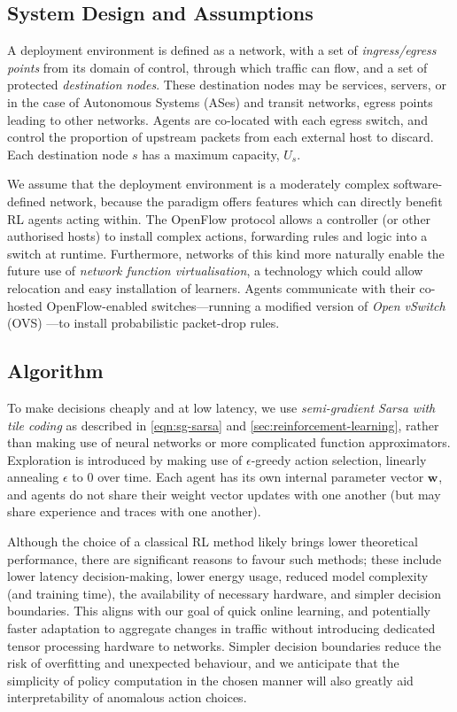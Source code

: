 \documentclass[10pt, times, conference, letterpaper]{IEEEtran}
\newcommand{\wvec}[1]{\ensuremath{\bm{w}_{#1}}}
\begin{document}
\subsection{System Design and Assumptions}
A deployment environment is defined as a network, with a set of \emph{ingress/egress points} from its domain of control, through which traffic can flow, and a set of protected \emph{destination nodes}.
These destination nodes may be services, servers, or in the case of Autonomous Systems (ASes) and transit networks, egress points leading to other networks.
Agents are co-located with each egress switch, and control the proportion of upstream packets from each external host to discard.
Each destination node $s$ has a maximum capacity, $U_s$.

We assume that the deployment environment is a moderately complex software-defined network, because the paradigm offers features which can directly benefit RL agents acting within.
The OpenFlow protocol allows a controller (or other authorised hosts) to install complex actions, forwarding rules and logic into a switch at runtime.
Furthermore, networks of this kind more naturally enable the future use of \emph{network function virtualisation}, a technology which could allow relocation and easy installation of learners.
Agents communicate with their co-hosted OpenFlow-enabled switches---running a modified version of \emph{Open vSwitch} (OVS) \cite{open-vswitch}---to install probabilistic packet-drop rules.

\subsection{Algorithm}
To make decisions cheaply and at low latency, we use \emph{semi-gradient Sarsa with tile coding} as described in \cref{eqn:sg-sarsa} and \cref{sec:reinforcement-learning}, rather than making use of neural networks or more complicated function approximators.
Exploration is introduced by making use of $\epsilon$-greedy action selection, linearly annealing $\epsilon$ to 0 over time.
Each agent has its own internal parameter vector $\wvec{}$, and agents do not share their weight vector updates with one another (but may share experience and traces with one another).

Although the choice of a classical RL method likely brings lower theoretical performance, there are significant reasons to favour such methods; these include lower latency decision-making, lower energy usage, reduced model complexity (and training time), the availability of necessary hardware, and simpler decision boundaries.
This aligns with our goal of quick online learning, and potentially faster adaptation to aggregate changes in traffic without introducing dedicated tensor processing hardware to networks.
Simpler decision boundaries reduce the risk of overfitting and unexpected behaviour, and we anticipate that the simplicity of policy computation in the chosen manner will also greatly aid interpretability of anomalous action choices.
\end{document}
